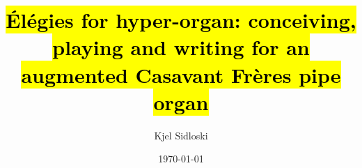 \documentclass[12pt,twoside,maitrise]{dms_ks}
\theoremstyle{definition}
\begin{document}
\entetedynamique




\title{\hl{Élégies for hyper-organ: conceiving, playing and writing for an augmented Casavant Frères pipe organ}}


\author{Kjel Sidloski}



\date{\today} %

\sujet{}








\end{document}
